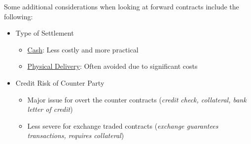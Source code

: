 \documentclass[11pt]{article}
\begin{document}
Some additional considerations when looking at forward contracts include the following:
\begin{itemize}
\item Type of Settlement
\begin{itemize}
\item \underline{Cash}: Less costly and more practical
\item \underline{Physical Delivery}: Often avoided due to significant costs
\end{itemize}
\item Credit Risk of Counter Party
\begin{itemize}
\item Major issue for overt the counter contracts (\textit{credit check, collateral, bank letter of credit})
\item Less severe for exchange traded contracts (\textit{exchange guarantees transactions, requires collateral})
\end{itemize}
\end{itemize}
\end{document}
